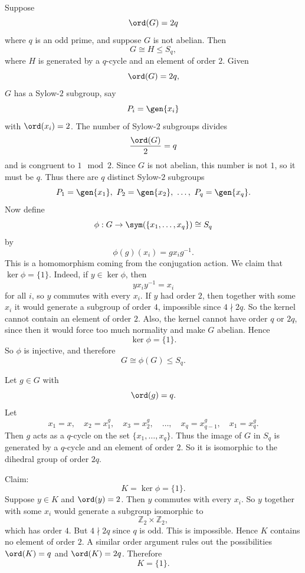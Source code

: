 \begin{theorem}{
    Suppose
    \[
        \ord(G)=2q
    \]
    where $q$ is an odd prime, and suppose $G$ is not abelian.
    Then
    \[
        G\cong H\leq S_q,
    \]
    where $H$ is generated by a $q$-cycle and an element of order $2$.
}
    Given
    \[
        \ord(G)=2q,
    \]
    $G$ has a Sylow-$2$ subgroup, say
    \[
        P_i=\gen{x_i}
    \]
    with $\ord(x_i)=2$.
    The number of Sylow-$2$ subgroups divides
    \[
        \frac{\ord(G)}{2}=q
    \]
    and is congruent to $1\mod 2$.
    Since $G$ is not abelian, this number is not $1$, so it must be $q$.
    Thus there are $q$ distinct Sylow-$2$ subgroups
    \[
        P_1=\gen{x_1},\ P_2=\gen{x_2},\ \dots,\ P_q=\gen{x_q}.
    \]
    Now define
    \[
        \phi:G\to \sym(\{x_1,\dots,x_q\})\cong S_q
    \]
    by
    \[
        \phi(g)(x_i)=gx_ig^{-1}.
    \]
    This is a homomorphism coming from the conjugation action.
    We claim that $\ker\phi=\{1\}$.
    Indeed, if $y\in \ker\phi$, then
    \[
        yx_iy^{-1}=x_i
    \]
    for all $i$, so $y$ commutes with every $x_i$.
    If $y$ had order $2$, then together with some $x_i$ it would generate a subgroup of order $4$, impossible since $4\nmid 2q$.
    So the kernel cannot contain an element of order $2$.
    Also, the kernel cannot have order $q$ or $2q$, since then it would force too much normality and make $G$ abelian.
    Hence
    \[
        \ker\phi=\{1\}.
    \]
    So $\phi$ is injective, and therefore
    \[
        G\cong \phi(G)\leq S_q.
    \]
\end{theorem}

\begin{example}
    Let $g\in G$ with
    \[
        \ord(g)=q.
    \]
    Let
    \[
        x_1=x,\quad x_2=x_1^g,\quad x_3=x_2^g,\quad \dots,\quad x_q=x_{q-1}^g,\quad x_1=x_q^g.
    \]
    Then $g$ acts as a $q$-cycle on the set $\{x_1,\dots,x_q\}$.
    Thus the image of $G$ in $S_q$ is generated by a $q$-cycle and an element of order $2$.
    So it is isomorphic to the dihedral group of order $2q$.
\end{example}

\begin{example}
    Claim:
    \[
        K=\ker\phi=\{1\}.
    \]
    Suppose $y\in K$ and $\ord(y)=2$.
    Then $y$ commutes with every $x_i$.
    So $y$ together with some $x_i$ would generate a subgroup isomorphic to
    \[
        \mathbb{Z}_2\times \mathbb{Z}_2,
    \]
    which has order $4$.
    But $4\nmid 2q$ since $q$ is odd.
    This is impossible.
    Hence $K$ contains no element of order $2$.
    A similar order argument rules out the possibilities $\ord(K)=q$ and $\ord(K)=2q$.
    Therefore
    \[
        K=\{1\}.
    \]
\end{example}